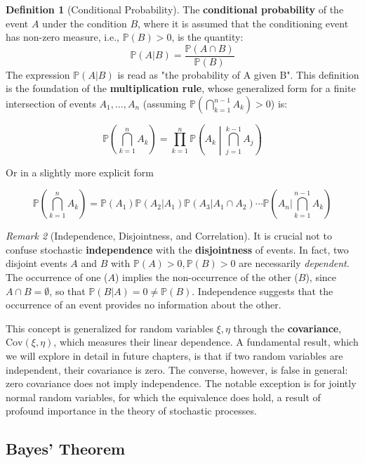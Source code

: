 \documentclass[12pt, openany]{book}
\theoremstyle{definition}
\newtheorem{definition}{Definition}[section]
\theoremstyle{plain}
\theoremstyle{remark}
\newtheorem{remark}[definition]{Remark}
\newcommand{\probP}{\mathbb{P}}
\begin{document}
\begin{definition}[Conditional Probability]
The \textbf{conditional probability} of the event $A$ under the condition $B$, where it is assumed that the conditioning event has non-zero measure, i.e., $\probP(B) > 0$, is the quantity:
$$ \probP(A|B) = \frac{\probP(A \cap B)}{\probP(B)} $$
The expression $\probP(A|B)$ is read as "the probability of A given B". This definition is the foundation of the \textbf{multiplication rule}, whose generalized form for a finite intersection of events $A_1, \dots, A_n$ (assuming $\probP(\bigcap_{k=1}^{n-1} A_k) > 0$) is:

$$ \probP\left(\bigcap_{k=1}^{n} A_k\right) = \prod_{k=1}^{n} \probP\left(A_k \middle| \bigcap_{j=1}^{k-1} A_j\right) $$

Or in a slightly more explicit form

$$ \probP\left(\bigcap_{k=1}^{n} A_k\right) = \probP(A_1) \probP(A_2|A_1) \probP(A_3|A_1 \cap A_2) \cdots \probP(A_n|\bigcap_{k=1}^{n-1} A_k) $$
\end{definition}

\begin{remark}[Independence, Disjointness, and Correlation]
It is crucial not to confuse stochastic \textbf{independence} with the \textbf{disjointness} of events. In fact, two disjoint events $A$ and $B$ with $\probP(A)>0, \probP(B)>0$ are necessarily \textit{dependent}. The occurrence of one ($A$) implies the non-occurrence of the other ($B$), since $A \cap B = \emptyset$, so that $\probP(B|A) = 0 \neq \probP(B)$. Independence suggests that the occurrence of an event provides no information about the other.

This concept is generalized for random variables $\xi, \eta$ through the \textbf{covariance}, $\mathrm{Cov}(\xi, \eta)$, which measures their linear dependence. A fundamental result, which we will explore in detail in future chapters, is that if two random variables are independent, their covariance is zero. The converse, however, is false in general: zero covariance does not imply independence. The notable exception is for jointly normal random variables, for which the equivalence does hold, a result of profound importance in the theory of stochastic processes.
\end{remark}

\subsection{Bayes' Theorem}
\end{document}
